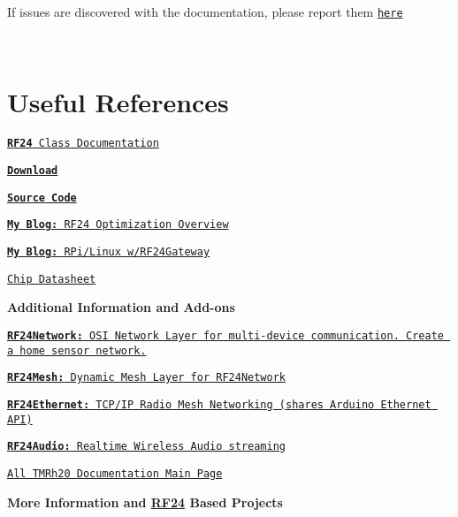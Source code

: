 If issues are discovered with the documentation, please report them \href{https://github.com/TMRh20/tmrh20.github.io/issues}{\tt here}

~\newline
 \hypertarget{index_Useful}{}\section{Useful References}\label{index_Useful}
\begin{DoxyItemize}
\item \href{http://tmrh20.github.io/RF24/classRF24.html}{\tt {\bfseries R\+F24} Class Documentation} \item \href{https://github.com/TMRh20/RF24/archive/master.zip}{\tt {\bfseries Download}} \item \href{https://github.com/tmrh20/RF24/}{\tt {\bfseries Source Code}} \item \href{http://tmrh20.blogspot.com/2014/03/high-speed-data-transfers-and-wireless.html}{\tt {\bfseries My Blog\+:} R\+F24 Optimization Overview} \item \href{http://tmrh20.blogspot.com/2016/08/raspberry-pilinux-with-nrf24l01.html}{\tt {\bfseries My Blog\+:} R\+Pi/\+Linux w/\+R\+F24\+Gateway} \item \href{http://www.nordicsemi.com/files/Product/data_sheet/nRF24L01_Product_Specification_v2_0.pdf}{\tt Chip Datasheet}\end{DoxyItemize}
{\bfseries Additional Information and Add-\/ons}

\begin{DoxyItemize}
\item \href{http://tmrh20.github.io/RF24Network}{\tt {\bfseries R\+F24\+Network\+:} O\+SI Network Layer for multi-\/device communication. Create a home sensor network.} \item \href{http://tmrh20.github.io/RF24Mesh}{\tt {\bfseries R\+F24\+Mesh\+:} Dynamic Mesh Layer for R\+F24\+Network} \item \href{http://tmrh20.github.io/RF24Ethernet}{\tt {\bfseries R\+F24\+Ethernet\+:} T\+C\+P/\+IP Radio Mesh Networking (shares Arduino Ethernet A\+PI)} \item \href{http://tmrh20.github.io/RF24Audio}{\tt {\bfseries R\+F24\+Audio\+:} Realtime Wireless Audio streaming} \item \href{http://tmrh20.github.io/}{\tt All T\+M\+Rh20 Documentation Main Page}\end{DoxyItemize}
{\bfseries More Information and \hyperlink{classRF24}{R\+F24} Based Projects}

